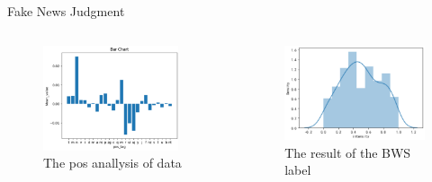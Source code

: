 \documentclass[10pt]{beamer}
\begin{document}
\begin{frame}{Fake News Judgment}
    \begin{columns}
        \begin{figure}
            \centering
            \includegraphics[width=0.9\textwidth]{pic/pos_analysis.png}
            \caption{The pos anallysis of data}
            \label{fig:my_label}
        \end{figure}
        \begin{figure}
            \centering
            \includegraphics[width=\textwidth]{pic/bws_res.png}
            \caption{The result of the BWS label}
            \label{fig:my_label}
        \end{figure}
    \end{columns}
\end{frame}
\end{document}
